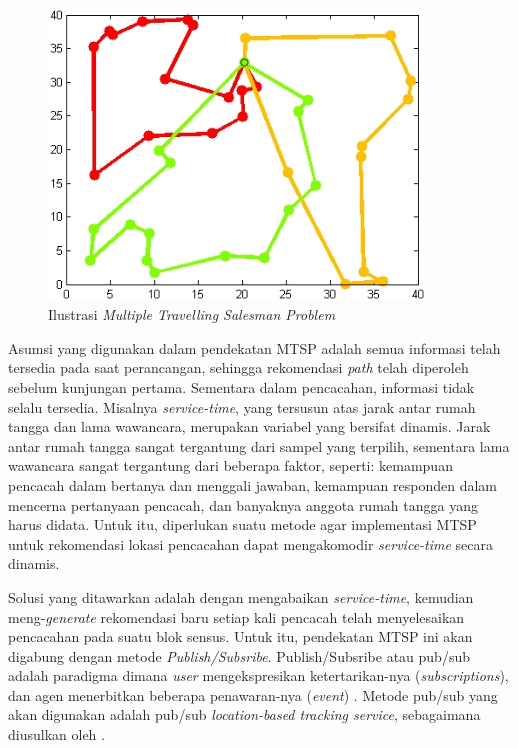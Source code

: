 \begin{figure}[!]
    \centering
    \includegraphics[width=10cm]{../../Resources/Images/mtsp}
    \caption{Ilustrasi \textit{Multiple Travelling Salesman Problem}}
    \label{fig:mtsp-ilustration}
\end{figure}


Asumsi yang digunakan dalam pendekatan MTSP adalah semua informasi telah tersedia pada saat perancangan, sehingga rekomendasi \textit{path} telah diperoleh sebelum kunjungan pertama. Sementara dalam pencacahan, informasi tidak selalu tersedia. Misalnya \textit{service-time}, yang tersusun atas jarak antar rumah tangga dan lama wawancara, merupakan variabel yang bersifat dinamis. Jarak antar rumah tangga sangat tergantung dari sampel yang terpilih, sementara lama wawancara sangat tergantung dari beberapa faktor, seperti: kemampuan pencacah dalam bertanya dan menggali jawaban, kemampuan responden dalam mencerna pertanyaan pencacah, dan banyaknya anggota rumah tangga yang harus didata. Untuk itu, diperlukan suatu metode agar implementasi MTSP untuk rekomendasi lokasi pencacahan dapat mengakomodir \textit{service-time} secara dinamis.


Solusi yang ditawarkan adalah dengan mengabaikan \textit{service-time}, kemudian meng-\textit{generate} rekomendasi baru setiap kali pencacah telah menyelesaikan pencacahan pada suatu blok sensus. Untuk itu, pendekatan MTSP ini akan digabung dengan metode \textit{Publish/Subsribe}. Publish/Subsribe atau pub/sub adalah paradigma dimana \textit{user} mengekspresikan ketertarikan-nya (\textit{subscriptions}), dan agen menerbitkan beberapa penawaran-nya (\textit{event}) \citep{fabret_filtering_2001}. Metode pub/sub yang akan digunakan adalah pub/sub \textit{location-based tracking service}, sebagaimana diusulkan oleh \citep{chen_efficient_2003}.


